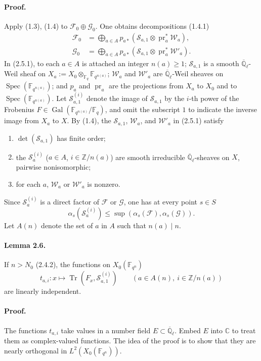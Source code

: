 \documentclass[10pt]{article}
\newcommand{\F}{\mathbb{F}}
\newcommand{\Z}{\mathbb{Z}}
\newcommand{\Ql}{\overline{\mathbb Q}_{\ell}}
\newcommand{\Tr}{\operatorname{Tr}}
\newcommand{\Spec}{\operatorname{Spec}}
\newcommand{\Gal}{\operatorname{Gal}}
\newcommand{\pr}{\operatorname{pr}}
\begin{document}
\paragraph{Proof.}
Apply (1.3), (1.4) to $\mathcal F_0\oplus\mathcal G_0$.
One obtains decompositions (1.4.1)
\begin{align}
 \mathcal F_0&=\bigoplus_{a\in A}p_{a*}\left(\mathcal S_{a,1}\otimes\pr_a^*\mathcal W_a\right),\tag{2.5.1}\\
 \mathcal G_0&=\bigoplus_{a\in A}p_{a*}\left(\mathcal S_{a,1}\otimes\pr_a^*\mathcal W'_a\right).
\end{align}
In (2.5.1), to each $a\in A$ is attached an integer $n(a)\ge1$; $\mathcal S_{a,1}$ is a smooth $\Ql$-Weil sheaf on $X_a:=X_0\otimes_{\F_q}\F_{q^{n(a)}}$; $\mathcal W_a$ and $\mathcal W'_a$ are $\Ql$-Weil sheaves on $\Spec(\F_{q^{n(a)}})$; and $p_a$ and $\pr_a$ are the projections from $X_a$ to $X_0$ and to $\Spec(\F_{q^{n(a)}})$.
Let $\mathcal S_{a,1}^{(i)}$ denote the image of $\mathcal S_{a,1}$ by the $i$-th power of the Frobenius $F\in\Gal(\F_{q^{n(a)}}/\F_q)$, and omit the subscript $1$ to indicate the inverse image from $X_a$ to $X$.
By (1.4), the $\mathcal S_{a,1}$, $\mathcal W_a$, and $\mathcal W'_a$ in (2.5.1) satisfy
\begin{enumerate}[label=(\roman*)]
\item $\det(\mathcal S_{a,1})$ has finite order;
\item the $\mathcal S_a^{(i)}$ ($a\in A$, $i\in\Z/n(a)$) are smooth irreducible $\Ql$-sheaves on $X$, pairwise nonisomorphic;
\item for each $a$, $\mathcal W_a$ or $\mathcal W'_a$ is nonzero.
\end{enumerate}
Since $\mathcal S_a^{(i)}$ is a direct factor of $\mathcal F$ or $\mathcal G$, one has at every point $s\in S$
\[
 \alpha_s(\mathcal S_a^{(i)})\le \sup(\alpha_s(\mathcal F),\alpha_s(\mathcal G)).
\]
Let $A(n)$ denote the set of $a$ in $A$ such that $n(a)\mid n$.

\paragraph{Lemma 2.6.}
If $n>N_0$ (2.4.2), the functions on $X_0(\F_{q^n})$
\[
 t_{a,i}:x\longmapsto \Tr(F_x,\mathcal S_{a,1}^{(i)})\qquad (a\in A(n),\ i\in\Z/n(a))
\]
are linearly independent.

\paragraph{Proof.}
The functions $t_{a,i}$ take values in a number field $E\subset\Ql$.
Embed $E$ into $\mathbb C$ to treat them as complex-valued functions.
The idea of the proof is to show that they are nearly orthogonal in $L^2(X_0(\F_{q^n}))$.
\end{document}
